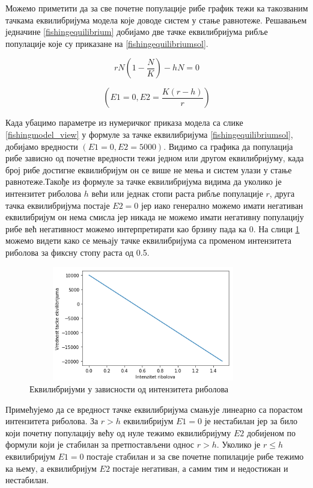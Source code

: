 \documentclass[a4paper]{article}
\begin{document}
{ Можемо приметити да за све почетне популације рибе график тежи ка такозваним тачкама еквилибријума модела које доводе систем у стање равнотеже. Решавањем једначине \ref{fishingequilibrium} добијамо две тачке еквилибријума рибље популације које су приказане на \ref{fishingequilibriumsol}.

\begin{equation}
    \label{fishingequilibrium}
    rN\left(1-\frac{N}{K}\right) - hN = 0
\end{equation}

\begin{equation}
    \label{fishingequilibriumsol}
     \left(E1 = 0,   E2 = \frac{K(r - h) }{r}\right)
\end{equation}

Када убацимо параметре из нумеричког приказа модела са слике \ref{fishingmodel_view} у формуле за тачке еквилибријума \ref{fishingequilibriumsol}, добијамо вредности $(E1=0, E2=5000)$. Видимо са графика да популација рибе зависно од почетне вредности тежи једном или другом еквилибријуму, када број рибе достигне еквилибријум он се више не мења и систем улази у стање равнотеже.Такође из формуле за тачке еквилибријума видима да уколико је интензитет риболова $h$ већи или једнак стопи раста рибље популације $r$, друга тачка еквилибријума постаје $E2=0$ јер иако генерално можемо имати негативан еквилибријум он нема смисла јер никада не можемо имати негативну популацију рибе већ негативност можемо интерпретирати као брзину пада ка 0. На слици \ref{equilibriumsgraph} можемо видети како се мењају тачке еквилибријума са променом интензитета риболова за фиксну стопу раста од 0.5.

\begin{figure}[h!]
	\centering
	\includegraphics[width=10cm,height=5.0cm]{images/Equilibriums.png}
	\caption{Еквилибријуми у зависности од интензитета риболова}
	\label{equilibriumsgraph}
\end{figure}

Примећујемо да се вредност тачке еквилибријума смањује линеарно са порастом интензитета риболова. За $r>h$ еквилибријум $E1=0$ је нестабилан јер за било који почетну популацију већу од нуле тежимо еквилибријуму $E2$ добијеном по формули који је стабилан за претпостављени однос $r>h$. Уколико је $r \leq h$ еквилибријум $E1=0$ постаје стабилан и за све почетне попилације рибе тежимо ка њему, а еквилибријум $E2$ постаје негативан, а самим тим и недостижан и нестабилан.

}
\end{document}
